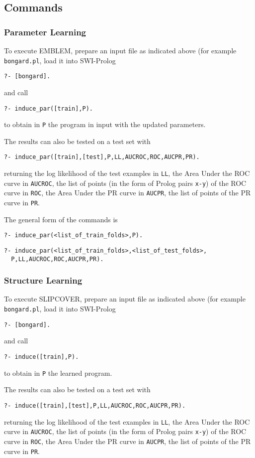 \documentclass[a4paper,10pt]{article}
\begin{document}
\subsection{Commands}
\subsubsection{Parameter Learning}
To execute EMBLEM, prepare an input file as indicated above 
(for example \verb|bongard.pl|, load it into SWI-Prolog
\begin{verbatim}
?- [bongard].
\end{verbatim}
and call
\begin{verbatim}
?- induce_par([train],P).
\end{verbatim}
to obtain in \verb|P| the program in input with the updated parameters.

The results can also be tested on a test set with
\begin{verbatim}
?- induce_par([train],[test],P,LL,AUCROC,ROC,AUCPR,PR).
\end{verbatim}
returning the log likelihood of the test examples in \verb|LL|, the Area Under the ROC curve in \verb|AUCROC|, the list of points (in the form of Prolog pairs \verb|x-y|) of the ROC curve in \verb|ROC|,
the Area Under the PR curve in \verb|AUCPR|, the list of points of the PR curve in \verb|PR|.

The general form of the commands is
\begin{verbatim}
?- induce_par(<list_of_train_folds>,P).
\end{verbatim}
\begin{verbatim}
?- induce_par(<list_of_train_folds>,<list_of_test_folds>,
  P,LL,AUCROC,ROC,AUCPR,PR).
\end{verbatim}

\subsubsection{Structure Learning}
To execute SLIPCOVER,
prepare an input file as indicated above 
(for example \verb|bongard.pl|, load it into SWI-Prolog
\begin{verbatim}
?- [bongard].
\end{verbatim}
and call
\begin{verbatim}
?- induce([train],P).
\end{verbatim}
to obtain in \verb|P| the learned program.

The results can also be tested on a test set with
\begin{verbatim}
?- induce([train],[test],P,LL,AUCROC,ROC,AUCPR,PR).
\end{verbatim}
returning the log likelihood of the test examples in \verb|LL|, the Area Under the ROC curve in \verb|AUCROC|, the list of points (in the form of Prolog pairs \verb|x-y|) of the ROC curve in \verb|ROC|,
the Area Under the PR curve in \verb|AUCPR|, the list of points of the PR curve in \verb|PR|.
\end{document}
